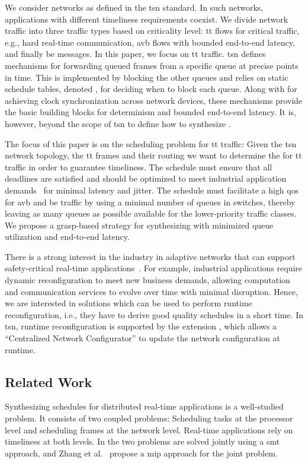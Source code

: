 We consider networks as defined in the \gls{tsn} standard.
In such networks, applications with different timeliness requirements coexist. We divide network traffic into three traffic types based on criticality level:
\gls{tt} flows for critical traffic, e.g., hard real-time communication, \gls{avb} flows with bounded end-to-end latency, and finally \gls{be} messages. In this paper, we focus on \gls{tt} traffic. \gls{tsn} defines mechanisms for forwarding queued frames from a specific queue at precise points in time.
This is implemented by blocking the other queues and relies on static schedule tables, denoted , for deciding when to block each queue.
Along with  for achieving clock synchronization across network devices, these mechanisms provide the basic building blocks for determinism and bounded end-to-end latency.
It is, however, beyond the scope of \gls{tsn} to define how to synthesize .

The focus of this paper is on the scheduling problem for \gls{tt} traffic: Given the \gls{tsn} network topology, the \gls{tt} frames and their routing we want to determine the  for \gls{tt} traffic in order to guarantee timeliness.
The schedule must ensure that all deadlines are satisfied and should be optimized to meet industrial application demands~\cite{ousterhout2013, craciunas16combined} for minimal latency and jitter. The schedule must facilitate a high \gls{qos} for \gls{avb} and \gls{be} traffic by using a minimal number of queues in switches, thereby leaving as many queues as possible available for the lower-priority traffic classes. We propose a \gls{grasp}-based strategy for synthesizing  with minimized queue utilization and end-to-end latency.

There is a strong interest in the industry in adaptive networks that can support safety-critical real-time applications~\cite{emc2}. For example, industrial applications require dynamic reconfiguration to meet new business demands, allowing computation and communication services to evolve over time with minimal disruption. Hence, we are interested in solutions which can be used to perform runtime reconfiguration, i.e., they have to derive good quality schedules in a short time. In \gls{tsn}, runtime reconfiguration is supported by the extension , which allows a ``Centralized Network Configurator'' to update the network configuration at runtime.

\subsection{Related Work}
Synthesizing schedules for distributed real-time applications is a well-studied problem.
It consists of two coupled problems: Scheduling tasks at the processor level and scheduling frames at the network level.
Real-time applications rely on timeliness at both levels.
In \cite{craciunas16combined} the two problems are solved jointly using a \gls{smt} approach, and Zhang et al.~\cite{zhang2014} propose a \gls{mip} approach for the joint problem.

